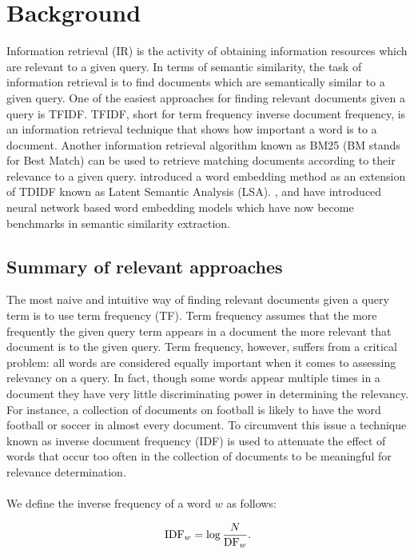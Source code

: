 \chapter{Background} 
\label{chapter:background}
Information retrieval (IR) is the activity of obtaining information resources which are relevant to a given query. In terms of semantic similarity, the task of information retrieval is to find documents which are semantically similar to a given query. One of the easiest approaches for finding relevant documents given a query is TFIDF.
TFIDF, short for term frequency inverse document frequency, is an information retrieval technique that shows how important a word is to a document. Another information retrieval algorithm known as BM25 (BM stands for Best Match) \cite{robertson2009probabilistic} can be used to retrieve matching documents according to their relevance to a given query. \cite{dumais2004latent} introduced a word embedding method as an extension of TDIDF known as Latent Semantic Analysis (LSA). \cite{mikolov2013efficient}, \cite{pennington2014glove} and \cite{shazeer2016swivel} have introduced neural network based word embedding models which have now become benchmarks in semantic similarity extraction.


\section{Summary of relevant approaches}
The most naive and intuitive way of finding relevant documents given a query term is to use term frequency (TF). Term frequency assumes that the more frequently the given query term appears in a document the more relevant that document is to the given query. Term frequency, however, suffers from a critical problem: all words are considered equally important when it comes to assessing relevancy on a query. In fact, though some words appear multiple times in a document they have very little discriminating power  in determining the relevancy. For instance, a collection of documents on football is likely to have the word football or soccer in almost every document. To circumvent this issue a technique known as inverse document frequency (IDF) is used to  attenuate the effect of words that occur too often in the collection of documents to be meaningful for relevance determination.
\\
\\
We define the inverse frequency of a word $w$ as follows:

\begin{displaymath}
\mbox{IDF}_w = \log {N\over \mbox{DF}_w}.
\end{displaymath}

